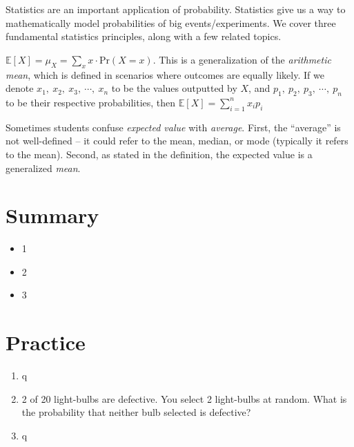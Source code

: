 \documentclass[main.tex]{subfiles}
\begin{document}
Statistics are an important application of probability. Statistics give us a way to mathematically model probabilities of big events/experiments. We cover three fundamental statistics principles, along with a few related topics.

\begin{defn}
	\(\mathbb{E}[X] = \mu_X = \sum_{x}^{} x \cdot \mathrm{Pr}(X = x)\). This is a generalization of the \textit{arithmetic mean}, which is defined in scenarios where outcomes are equally likely. If we denote \(x_1,\ x_2,\ x_3,\ \cdots,\ x_n\) to be the values outputted by \(X\), and \(p_1,\ p_2,\ p_3,\ \cdots,\ p_n\) to be their respective probabilities, then \(\mathbb{E}[X] = \sum_{i=1}^{n} x_i p_i\)
\end{defn}

Sometimes students confuse \textit{expected value} with \textit{average}. First, the ``average'' is not well-defined -- it could refer to the mean, median, or mode (typically it refers to the mean). Second, as stated in the definition, the expected value is a generalized \textit{mean}.

\begin{defn}
	
\end{defn}

\begin{defn}
	
\end{defn}

\section{Summary}

\begin{itemize}
	\item 1
	\item 2
	\item 3
\end{itemize}

\section{Practice}

\begin{enumerate}
	\item q
	\item 2 of 20 light-bulbs are defective. You select 2 light-bulbs at random. What is the probability that neither bulb selected is defective?
	\item q
\end{enumerate}
\end{document}
